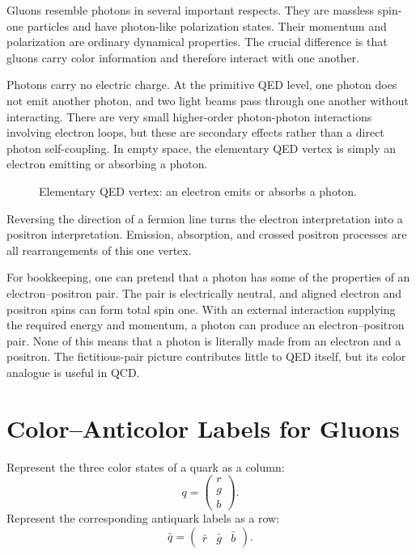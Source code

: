 Gluons resemble photons in several important respects. They are massless spin-one particles and have photon-like polarization states. Their momentum and polarization are ordinary dynamical properties. The crucial difference is that gluons carry color information and therefore interact with one another.

Photons carry no electric charge. At the primitive QED level, one photon does not emit another photon, and two light beams pass through one another without interacting. There are very small higher-order photon-photon interactions involving electron loops, but these are secondary effects rather than a direct photon self-coupling. In empty space, the elementary QED vertex is simply an electron emitting or absorbing a photon.

\begin{figure}[h]
\centering
{}
\caption{Elementary QED vertex: an electron emits or absorbs a photon.}
\end{figure}

Reversing the direction of a fermion line turns the electron interpretation into a positron interpretation. Emission, absorption, and crossed positron processes are all rearrangements of this one vertex.

For bookkeeping, one can pretend that a photon has some of the properties of an electron--positron pair. The pair is electrically neutral, and aligned electron and positron spins can form total spin one. With an external interaction supplying the required energy and momentum, a photon can produce an electron--positron pair. None of this means that a photon is literally made from an electron and a positron. The fictitious-pair picture contributes little to QED itself, but its color analogue is useful in QCD.

\section{Color--Anticolor Labels for Gluons}

Represent the three color states of a quark as a column:
\begin{equation}
q=
\begin{pmatrix}
r\\
g\\
b
\end{pmatrix}.
\end{equation}
Represent the corresponding antiquark labels as a row:
\begin{equation}
\bar q=
\begin{pmatrix}
\bar r&\bar g&\bar b
\end{pmatrix}.
\end{equation}

